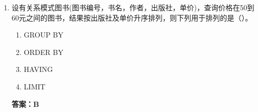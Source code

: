 \documentclass[12pt, a4paper]{article}
\begin{document}
\begin{enumerate}[label=\arabic*.]
	\item 设有关系模式图书(图书编号，书名，作者，出版社，单价)，查询价格在50到60元之间的图书，结果按出版社及单价升序排列，则下列用于排列的是（\quad）。
	      \begin{enumerate}
		      \item GROUP BY
		      \item ORDER BY
		      \item HAVING
		      \item LIMIT
	      \end{enumerate}
	      \textbf{答案：B}
\end{enumerate}
\end{document}
